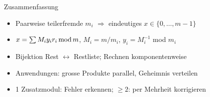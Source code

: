 \documentclass[a4paper, fontsize=7pt]{scrartcl}
\newcommand{\Mod}{\mskip3mu\mathrm{mod}\mskip3mu}
\begin{document}
\begin{subbox}{Zusammenfassung}
\begin{itemize}
    \item Paarweise teilerfremde $m_i$ $\Rightarrow$ eindeutiges
          $x \in \{0, \ldots, m-1\}$
    \item $x = \sum M_i y_i r_i \Mod m$, $M_i = m/m_i$,
          $y_i = M_i^{-1}$ mod $m_i$
    \item Bijektion Rest $\leftrightarrow$ Restliste; Rechnen
          komponentenweise
    \item Anwendungen: grosse Produkte parallel, Geheimnis verteilen
    \item 1 Zusatzmodul: Fehler erkennen; $\ge 2$: per Mehrheit korrigieren
\end{itemize}
\end{subbox}

%
%
%
\end{document}
